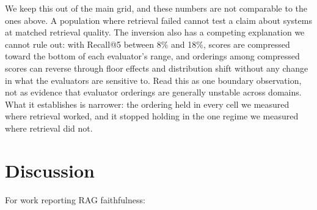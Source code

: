 \documentclass[11pt]{article}
\begin{document}
We keep this out of the main grid, and these numbers are not comparable to the ones above. A population where retrieval failed cannot test a claim about systems at matched retrieval quality. The inversion also has a competing explanation we cannot rule out: with Recall@5 between 8\% and 18\%, scores are compressed toward the bottom of each evaluator's range, and orderings among compressed scores can reverse through floor effects and distribution shift without any change in what the evaluators are sensitive to. Read this as one boundary observation, not as evidence that evaluator orderings are generally unstable across domains. What it establishes is narrower: the ordering held in every cell we measured where retrieval worked, and it stopped holding in the one regime we measured where retrieval did not.


\section{Discussion}
\label{sec:discussion}

For work reporting RAG faithfulness:
\end{document}
